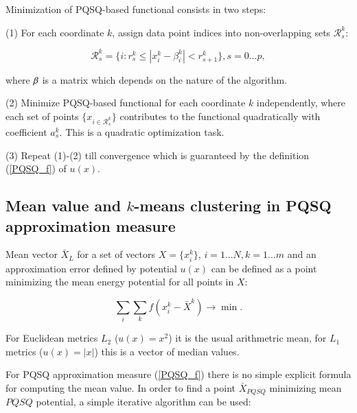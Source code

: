 \documentclass[preprint,12pt]{elsarticle}
\makeatletter
\def\BState{\State\hskip-\ALG@thistlm}
\makeatother
\begin{document}
Minimization of PQSQ-based functional consists in two steps:

(1) For each coordinate $k$, assign data point indices into non-overlapping sets $\mathcal{R}_s^k$:

\begin{equation}
\mathcal{R}_s^k= \{i: r_{s}^k \leq |x_i^k-\beta^k_i| < r_{s+1}^k\}, s = 0...p,
\end{equation}

\noindent where $\bf{\beta}$ is a matrix which depends on the nature of the algorithm.

(2) Minimize PQSQ-based functional for each coordinate $k$ independently, where each set of points $\{x_{i\in \mathcal{R}_s^k}\}$ contributes
to the functional quadratically with coefficient $a_s^k$. This is a quadratic optimization task.

(3) Repeat (1)-(2) till convergence which is guaranteed by the definition (\ref{PQSQ_f}) of $u(x)$.


\subsection{Mean value and $k$-means clustering in PQSQ approximation measure}

Mean vector $\bar{X}_L$  for a set of vectors $X=\{x_i^k\}$, $i=1...N, k=1...m$ and an approximation error defined by potential $u(x)$ can be defined as a point minimizing the mean energy potential for all points in  $X$:

\begin{equation}
\sum_i\sum_k f(x_i^k-\bar{X}^k) \rightarrow \min.
\end{equation}

For Euclidean metrics $L_2$ ($u(x)=x^2$) it is the usual arithmetric mean, for $L_1$ metrics ($u(x)=|x|$) this is a vector of median values.

For PQSQ approximation measure (\ref{PQSQ_f}) there is no simple explicit formula for computing the mean value.  In order to find a point $\bar{X}_{PQSQ}$ minimizing mean $PQSQ$ potential, a simple iterative algorithm can be used:

\end{document}
